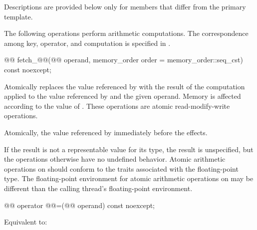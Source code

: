 \pnum
Descriptions are provided below only for members
that differ from the primary template.

\pnum
The following operations perform arithmetic computations.
The correspondence among key, operator, and computation is specified
in .

%
%
\begin{itemdecl}
@@ fetch_@@(@@ operand,
                          memory_order order = memory_order::seq_cst) const noexcept;
\end{itemdecl}

\begin{itemdescr}
\pnum
\effects
Atomically replaces the value referenced by  with
the result of the computation applied to the value referenced by 
and the given operand.
Memory is affected according to the value of .
These operations are atomic read-modify-write operations.

\pnum
\returns
Atomically, the value referenced by 
immediately before the effects.

\pnum
\remarks
If the result is not a representable value for its type,
the result is unspecified,
but the operations otherwise have no undefined behavior.
Atomic arithmetic operations on  should conform to
the  traits
associated with the floating-point type.
The floating-point environment
for atomic arithmetic operations on 
may be different than the calling thread's floating-point environment.
\end{itemdescr}

%
%
\begin{itemdecl}
@@ operator @@=(@@ operand) const noexcept;
\end{itemdecl}

\begin{itemdescr}
\pnum
\effects
Equivalent to:
\end{itemdescr}

